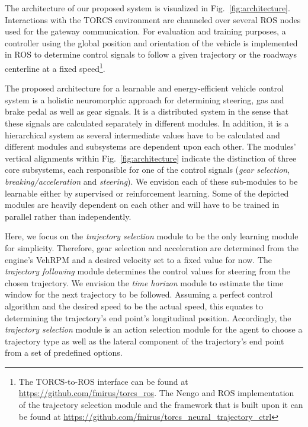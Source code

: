 The architecture of our proposed system is visualized in Fig.~\ref{fig:architecture}.
Interactions with the \ac{TORCS} environment \parencite[see][for detailed information on the sensor and actuator setup]{Loiacono2010} are channeled over several \ac{ROS} nodes used for the gateway communication.
For evaluation and training purposes, a controller using the global position and orientation of the vehicle is implemented in \ac{ROS} to determine control signals to follow a given trajectory or the roadways centerline at a fixed speed\footnote{The \ac{TORCS}-to-\ac{ROS} interface can be found at \url{https://github.com/fmirus/torcs_ros}.
The Nengo and \ac{ROS} implementation of the trajectory selection module and the framework that is built upon it can be found at \url{https://github.com/fmirus/torcs_neural_trajectory_ctrl}}.\par

The proposed architecture for a learnable and energy-efficient vehicle control system is a holistic neuromorphic approach for determining steering, gas and brake pedal as well as gear signals.
It is a distributed system in the sense that these signals are calculated separately in different modules.
In addition, it is a hierarchical system as several intermediate values have to be calculated and different modules and subsystems are dependent upon each other.
The modules' vertical alignments within Fig.~\ref{fig:architecture} indicate the distinction of three core subsystems, each responsible for one of the control signals (\emph{gear selection}, \emph{breaking/acceleration} and \emph{steering}).
We envision each of these sub-modules to be learnable either by supervised or reinforcement learning.
Some of the depicted modules are heavily dependent on each other and will have to be trained in parallel rather than independently. 

Here, we focus on the \emph{trajectory selection} module to be the only learning module for simplicity.
Therefore, gear selection and acceleration are determined from the engine's \ac{VehRPM} and a desired velocity set to a fixed value for now.
The \emph{trajectory following} module determines the control values for steering from the chosen trajectory.
We envision the \emph{time horizon} module to estimate the time window for the next trajectory to be followed.
Assuming a perfect control algorithm and the desired speed to be the actual speed, this equates to determining the trajectory's end point's longitudinal position.
Accordingly, the \emph{trajectory selection} module is an action selection module for the agent to choose a trajectory type as well as the lateral component of the trajectory's end point from a set of predefined options.

